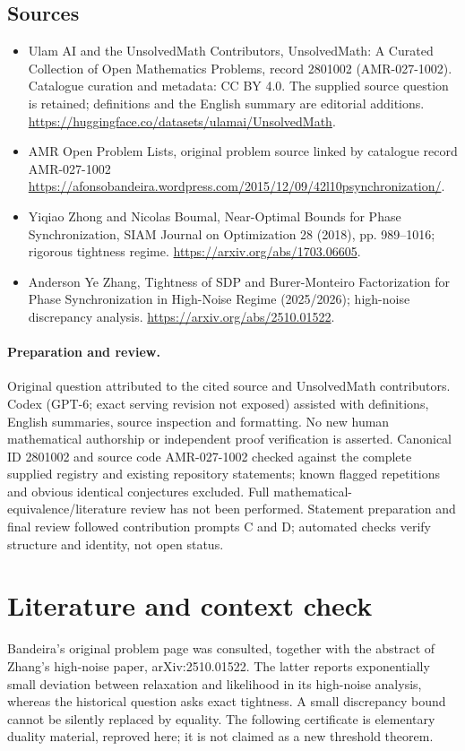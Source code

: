 \documentclass[11pt]{article}
\begin{document}
\subsection{Sources}
\begin{itemize}
\item[S1] Ulam AI and the UnsolvedMath Contributors, UnsolvedMath: A Curated Collection of Open Mathematics Problems, record 2801002 (AMR-027-1002). Catalogue curation and metadata: CC BY 4.0. The supplied source question is retained; definitions and the English summary are editorial additions.
\url{https://huggingface.co/datasets/ulamai/UnsolvedMath}.
\item[S2] AMR Open Problem Lists, original problem source linked by catalogue record AMR-027-1002
\url{https://afonsobandeira.wordpress.com/2015/12/09/42l10psynchronization/}.
\item[S3] Yiqiao Zhong and Nicolas Boumal, Near-Optimal Bounds for Phase Synchronization, SIAM Journal on Optimization 28 (2018), pp. 989--1016; rigorous tightness regime.
\url{https://arxiv.org/abs/1703.06605}.
\item[S4] Anderson Ye Zhang, Tightness of SDP and Burer-Monteiro Factorization for Phase Synchronization in High-Noise Regime (2025/2026); high-noise discrepancy analysis.
\url{https://arxiv.org/abs/2510.01522}.
\end{itemize}
\paragraph{Preparation and review.}
Original question attributed to the cited source and UnsolvedMath contributors. Codex (GPT-6; exact serving revision not exposed) assisted with definitions, English summaries, source inspection and formatting. No new human mathematical authorship or independent proof verification is asserted. Canonical ID 2801002 and source code AMR-027-1002 checked against the complete supplied registry and existing repository statements; known flagged repetitions and obvious identical conjectures excluded. Full mathematical-equivalence/literature review has not been performed. Statement preparation and final review followed contribution prompts C and D; automated checks verify structure and identity, not open status.
\label{end:2801002}

\section{Literature and context check}
Bandeira's original problem page was consulted, together with the abstract of
Zhang's high-noise paper, arXiv:2510.01522. The latter reports exponentially small
deviation between relaxation and likelihood in its high-noise analysis, whereas
the historical question asks exact tightness. A small discrepancy bound cannot be
silently replaced by equality. The following certificate is elementary duality
material, reproved here; it is not claimed as a new threshold theorem.
\end{document}
